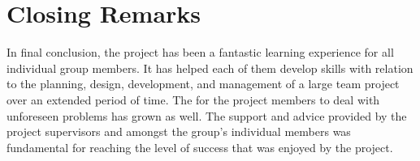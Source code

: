 \section{Closing Remarks}

    In final conclusion, the project has been a fantastic learning experience for all individual group members. It has helped each of them develop skills with relation to the planning, design, development, and management of a large team project over an extended period of time. The for the project members to deal with unforeseen problems has grown as well. The support and advice provided by the project supervisors and amongst the group's individual members was fundamental for reaching the level of success that was enjoyed by the project. 